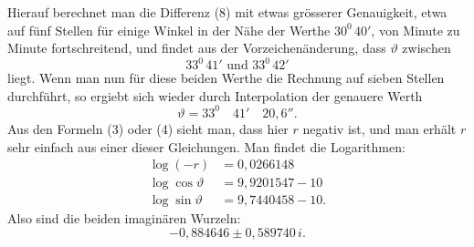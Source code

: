 
Hierauf berechnet man die Differenz (8) mit etwas grösserer Genauigkeit, etwa auf fünf Stellen für einige Winkel in der Nähe der Werthe $30^0\,40'$, von Minute zu Minute fortschreitend, und findet aus der Vorzeichenänderung, dass $\vartheta$ zwischen
\[
33^0\,41' \text{ und } 33^0\,42'
\]
liegt. Wenn man nun für diese beiden Werthe die Rechnung auf sieben Stellen durchführt, so ergiebt sich wieder durch Interpolation der genauere Werth
\[
\vartheta = 33^0 \quad 41' \quad 20{,}6''.
\]
Aus den Formeln (3) oder (4) sieht man, dass hier $r$ negativ ist, und man erhält $r$ sehr einfach aus einer dieser Gleichungen. Man findet die  Logarithmen:
\[
\begin{aligned}
\log(-r) &= 0{,}0266148\\
\log\cos\vartheta &= 9{,}9201547 - 10\\
\log\sin\vartheta &= 9{,}7440458 - 10.
\end{aligned}
\]
Also sind die beiden imaginären Wurzeln:
\[
-0{,}884646 \pm 0{,}589740\,i.
\]
